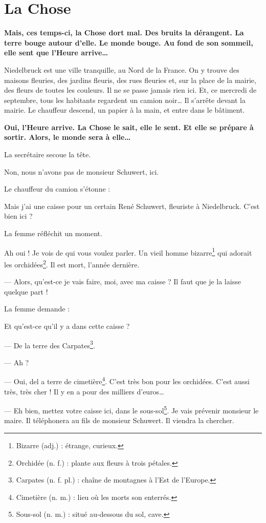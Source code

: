 \chapter{La Chose}
\textbf{Mais, ces temps-ci, la Chose dort mal. Des bruits la dérangent. La terre bouge autour d'elle. Le monde bouge. Au fond de
son sommeil, elle sent que l'Heure arrive\ldots{}}

Niedelbruck est une ville tranquille, au Nord de la France. On y trouve des maisons fleuries, des jardins fleuris,
des rues fleuries et, sur la place de la mairie, des fleurs de toutes les couleurs. Il ne se passe jamais rien ici.
Et, ce mercredi de septembre, tous les habitants regardent un camion noir\ldots{} Il s'arrête devant la mairie. Le
chauffeur descend, un papier à la main, et entre dans le bâtiment.

\textbf{Oui, l'Heure arrive. La Chose le sait, elle le sent. Et elle se prépare à sortir. Alors, le monde sera à elle\ldots{}}

La secrétaire secoue la tête.

\og{} Non, nous n'avons pas de monsieur Schuwert, ici. \fg{}

Le chauffeur du camion s'étonne :

\og{} Mais j'ai une caisse pour un certain René Schuwert, fleuriste à Niedelbruck. C'est bien ici ? \fg{}

La femme réfléchit un moment.

\og{} Ah oui ! Je vois de qui vous voulez parler. Un vieil homme bizarre\footnote{Bizarre (adj.) : étrange, curieux.}
qui adorait les orchidées\footnote{Orchidée (n. f.) : plante aux fleurs à trois pétales.}. Il est mort, l'année
dernière.

--- Alors, qu'est-ce je vais faire, moi, avec ma caisse ? Il faut que je la laisse quelque part ! \fg{}

La femme demande :

\og Et qu'est-ce qu'il y a dans cette caisse ?

--- De la terre des Carpates\footnote{Carpates (n. f. pl.) : chaîne de montagnes à l'Est de l'Europe.}.

--- Ah ?

--- Oui, del a terre de cimetière\footnote{Cimetière (n. m.) : lieu où les morts son enterrés.}. C'est très bon pour
    les orchidées. C'est aussi très, très cher ! Il y en a pour des milliers d'euros\ldots{}

--- Eh bien, mettez votre caisse ici, dans le sous-sol\footnote{Sous-sol (n. m.) : situé au-dessous du sol, cave.}.
    Je vais prévenir monsieur le maire. Il téléphonera au fils de monsieur Schuwert. Il viendra la chercher.

